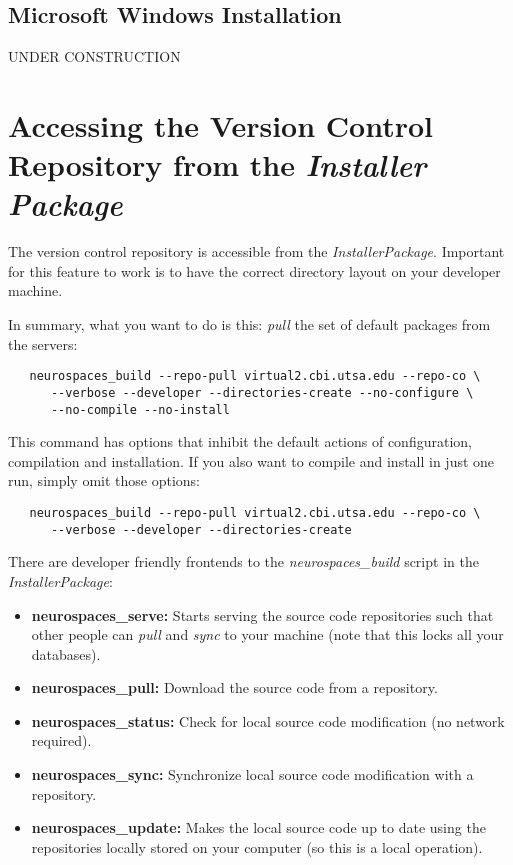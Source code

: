 \documentclass[12pt]{article}
\begin{document}
\subsection*{Microsoft Windows Installation}

UNDER CONSTRUCTION

\section*{Accessing the Version Control Repository from the {\it Installer Package}}

The version control repository is accessible from the {\it InstallerPackage}. Important for this feature to work is to have the correct directory layout on your developer machine.

In summary, what you want to do is this: {\it pull} the set of default packages from the servers:
\begin{verbatim}
   neurospaces_build --repo-pull virtual2.cbi.utsa.edu --repo-co \
      --verbose --developer --directories-create --no-configure \
      --no-compile --no-install
\end{verbatim}
This command has options that inhibit the default actions of configuration, compilation and installation. If you also want to compile and install in just one run, simply omit those options:

\begin{verbatim}
   neurospaces_build --repo-pull virtual2.cbi.utsa.edu --repo-co \
      --verbose --developer --directories-create
\end{verbatim}

There are developer friendly frontends to the {\it neurospaces\_build} script in the {\it InstallerPackage}:
\begin{itemize}
\item {\bf neurospaces\_serve:} Starts serving the source code repositories such that other people can {\it pull} and {\it sync} to your machine (note that this locks all your databases).
\item {\bf neurospaces\_pull:} Download the source code from a repository.
\item {\bf neurospaces\_status:} Check for local source code modification (no network required).
\item {\bf neurospaces\_sync:} Synchronize local source code modification with a repository.
\item {\bf neurospaces\_update:} Makes the local source code up to date using the repositories locally stored on your computer (so this is a local operation). 
\end{itemize}
\end{document}
